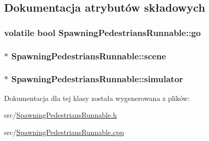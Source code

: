 \subsection{Dokumentacja atrybutów składowych}
\hypertarget{class_spawning_pedestrians_runnable_ad58c1c726a1f411f958d09ddab29325b}{
\subsubsection[{go}]{\setlength{\rightskip}{0pt plus 5cm}volatile bool Spawning\-Pedestrians\-Runnable\-::go\hspace{0.3cm}{\ttfamily [private]}}}\label{class_spawning_pedestrians_runnable_ad58c1c726a1f411f958d09ddab29325b}
\hypertarget{class_spawning_pedestrians_runnable_af9ce8e24f1f5f6ce1800192f75592023}{
\subsubsection[{scene}]{$\ast$ Spawning\-Pedestrians\-Runnable\-::scene\hspace{0.3cm}{\ttfamily [private]}}}\label{class_spawning_pedestrians_runnable_af9ce8e24f1f5f6ce1800192f75592023}
\hypertarget{class_spawning_pedestrians_runnable_a5eeaca249d8d0b3ec9d263f172eee0dc}{
\subsubsection[{simulator}]{$\ast$ Spawning\-Pedestrians\-Runnable\-::simulator\hspace{0.3cm}{\ttfamily [private]}}}\label{class_spawning_pedestrians_runnable_a5eeaca249d8d0b3ec9d263f172eee0dc}


Dokumentacja dla tej klasy została wygenerowana z plików\-:\begin{DoxyCompactItemize}
\item 
src/\hyperlink{_spawning_pedestrians_runnable_8h}{Spawning\-Pedestrians\-Runnable.\-h}\item 
src/\hyperlink{_spawning_pedestrians_runnable_8cpp}{Spawning\-Pedestrians\-Runnable.\-cpp}\end{DoxyCompactItemize}
